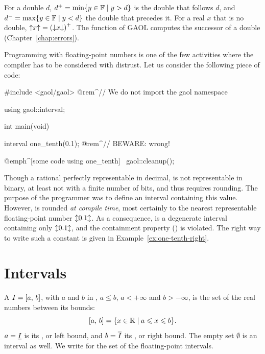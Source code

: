 \begin{Def}\label{def:neighbours}
%
For a double $d$, ${d}^+=\min\{y\in\mathbb{F}\mid y>d\}$ is the double
that follows $d$, and ${d}^-=\max\{y\in\mathbb{F}\mid y<d\}$ the double
that precedes it. For a real $x$ that is no double,
$\mathopen{\uparrow}x\mathclose{\uparrow}={(\mathopen{\downarrow}x\mathclose{\downarrow})}^+$. The function 
of GAOL computes the successor of a double (Chapter~\ref{chap:errors}).
\end{Def}

\begin{Ex}\label{ex:one-tenth}
Programming with floating-point numbers is one of the few activities where
the compiler has to be considered with distrust. Let us consider the
following piece of code:
\begin{example}
#include <gaol/gaol>  @rem^// We do not import the gaol namespace~

using gaol::interval;

int main(void) {
  interval one_tenth(0.1); @rem^// BEWARE: wrong!~

  @emph^[some code using one_tenth]~
  gaol::cleanup();
}
\end{example}
Though a rational perfectly representable in decimal,  is not
representable in binary, at least not with a finite number of bits, and
thus requires rounding. The purpose of the programmer was to define an
interval containing this value. However,  is rounded \emph{at
compile time}, most certainly to the nearest representable floating-point
number $\mathopen{\updownarrow}0.1\mathclose{\updownarrow}$. As a consequence,  is a
degenerate interval containing only $\mathopen{\updownarrow}0.1\mathclose{\updownarrow}$, and the
containment property () is violated. The right way
to write such a constant is given in Example~\ref{ex:one-tenth-right}.
\end{Ex}

\section{Intervals}\label{sec:intervals}
%

\begin{Def}\label{def:interval}
A  $I=[a,\,b]$, with $a$ and $b$ in \FSet,
$a\leq b$, $a<+\infty$ and $b>-\infty$, is the set of the real numbers
between its bounds:
\begin{equation*}
  [a,\,b]=\{x\in\mathbb{R}\mid a\leqslant x\leqslant b\}.
\end{equation*}
$a=\underline{I}$ is its , or left bound, and
$b=\overline{I}$ its , or right bound. The empty set
$\emptyset$ is an interval as well. We write \ISet{} for the set of the
floating-point intervals.
\end{Def}

